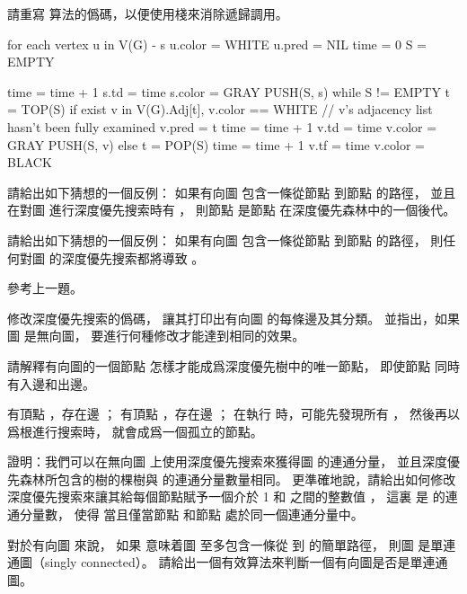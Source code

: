 \startANSWER
{}
\stopANSWER

\startEXERCISE
請重寫  算法的僞碼，以便使用棧來消除遞歸調用。
\stopEXERCISE

\startANSWER
{}
\startCLRS
for each vertex u in V(G) - {s}
	u.color = WHITE
	u.pred = NIL
time = 0
S = EMPTY

time = time + 1
s.td = time
s.color = GRAY
PUSH(S, s)
while S != EMPTY
	t = TOP(S)
	if exist v in V(G).Adj[t], v.color == WHITE	// v's adjacency list hasn't been fully examined
		v.pred = t
		time = time + 1
		v.td = time
		v.color = GRAY
		PUSH(S, v)
	else
		t = POP(S)
		time = time + 1
		v.tf = time
		v.color = BLACK
\stopCLRS
\stopANSWER

\startEXERCISE
請給出如下猜想的一個反例：
如果有向圖  包含一條從節點  到節點  的路徑，
並且在對圖  進行深度優先搜索時有 ，
則節點  是節點  在深度優先森林中的一個後代。
\stopEXERCISE

\startANSWER
\externalfigure[output/e22_3_8-1]
\stopANSWER

\startEXERCISE
請給出如下猜想的一個反例：
如果有向圖  包含一條從節點  到節點  的路徑，
則任何對圖  的深度優先搜索都將導致 。
\stopEXERCISE

\startANSWER
參考上一題。
\stopANSWER

\startEXERCISE
修改深度優先搜索的僞碼，
讓其打印出有向圖  的每條邊及其分類。
並指出，如果圖  是無向圖，
要進行何種修改才能達到相同的效果。
\stopEXERCISE

\startANSWER
{}
\stopANSWER

\startEXERCISE
請解釋有向圖的一個節點  怎樣才能成爲深度優先樹中的唯一節點，
即使節點  同時有入邊和出邊。
\stopEXERCISE

\startANSWER
有頂點 ，存在邊 ；
有頂點 ，存在邊 ；
在執行  時，可能先發現所有 ，
然後再以  爲根進行搜索時，  就會成爲一個孤立的節點。
\stopANSWER

\startEXERCISE
證明：我們可以在無向圖  上使用深度優先搜索來獲得圖  的連通分量，
並且深度優先森林所包含的樹的棵樹與  的連通分量數量相同。
更準確地說，請給出如何修改深度優先搜索來讓其給每個節點賦予一個介於 1 和  之間的整數值 ，
這裏  是  的連通分量數，
使得  當且僅當節點  和節點  處於同一個連通分量中。
\stopEXERCISE

\startANSWER
{}
\stopANSWER

\startEXERCISE\DIFFICULT
對於有向圖  來說，
如果  意味着圖  至多包含一條從  到  的簡單路徑，
則圖  是{\EMP 單連通圖}（singly connected）。
請給出一個有效算法來判斷一個有向圖是否是單連通圖。
\stopEXERCISE

\startANSWER
{}
\stopANSWER

\stopsection
